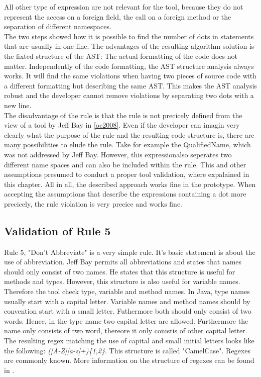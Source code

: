 All other type of expression are not relevant for the tool, because they do not represent the access on a foreign field, the call on a foreign method or the separation of different namespaces.
\\

The two steps showed how it is possible to find the number of dots in statements that are usually in one line. The advantages of the resulting algorithm solution is the fixted structure of the \acf{AST}: The actual formatting of the code does not matter. Independently of the code formatting, the \acf{AST} structure analysis always works. It will find the same violations when having two pieces of source code with a different formatting but describing the same \acf{AST}. This makes the \acf{AST} analysis robust and the developer cannot remove violations by separating two dots with a new line.
\\

The disadvantage of the rule is that the rule is not precicely defined from the view of a tool by Jeff Bay in \ref{oc2008}. Even if the developer can imagin very clearly what the purpose of the rule and the resulting code structure is, there are many possibilities to elude the rule. Take for example the QualifiedName, which was not addressed by Jeff Bay. However, this expressionalso seperates two different name spaces and can also be included within the rule. This and other assumptions presumed to conduct a proper tool validation, where expalained in this chapter. All in all, the described approach works fine in the prototype. When accepting the assumptions that describe the expressions containing a dot more precicely, the rule violation is very precice and works fine.
\\

\subsection*{Validation of Rule 5}
Rule 5, "Don't Abbreviate" is a very simple rule. It's basic statement is about the use of abbreviation.
Jeff Bay permits all abbreviations and states that names should only consist of two names. He states that this structure is useful for methods and types. However, this structure is also useful for variable names.
\\
Therefore the tool check type, variable and method names. In Java, type names usually start with a capital letter. Variable names and method names should by convention start with a small letter. Futhermore both should only consist of two words. 
Hence, in the type name two capital letter are allowed. Furthermore the name only consists of two word, thereore it only conistis of other capital letter. The resulting regex matching the use of capital and small initial letters looks like the following: \textit{([A-Z][a-z]+)\{1,2\}}. This structure is called "CamelCase". Regexes are commonly known. More information on the structure of regexes can be found in \cite[Regex]{wiki}.
\\

